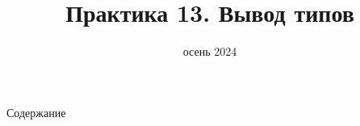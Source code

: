 
\newif\ifhandout




\title[13. Вывод типов]{Практика 13. Вывод типов}
\date{осень 2024}



    \setcounter{framenumber}{-1}
    \mymaketitle

    \begin{frame}[noframenumbering]{Содержание}
        \tableofcontents
    \end{frame}


